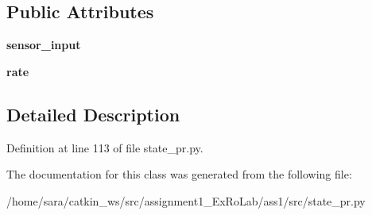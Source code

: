 \subsection*{Public Attributes}
\begin{DoxyCompactItemize}
\item 
\mbox{\label{classstate__pr_1_1Locked_adbf4f5dca36ad2e8dfc2fed2e5aec246}} 
{\bfseries sensor\+\_\+input}
\item 
\mbox{\label{classstate__pr_1_1Locked_adfe399f4810f2a685b7436bf21676ffb}} 
{\bfseries rate}
\end{DoxyCompactItemize}


\subsection{Detailed Description}


Definition at line 113 of file state\+\_\+pr.\+py.



The documentation for this class was generated from the following file\+:\begin{DoxyCompactItemize}
\item 
/home/sara/catkin\+\_\+ws/src/assignment1\+\_\+\+Ex\+Ro\+Lab/ass1/src/state\+\_\+pr.\+py\end{DoxyCompactItemize}
